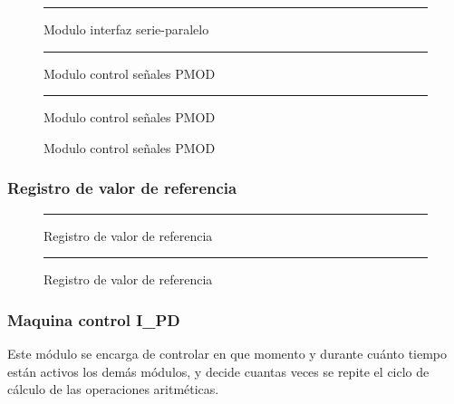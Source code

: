 \documentclass[12pt,a4paper]{article} %
\begin{document}
\begin{figure}[htbp]
  \centering
    \rule{35em}{0.3pt}
  \caption[ser_par]{Modulo interfaz serie-paralelo}
  \label{fig:ser_par}
\end{figure}

\begin{figure}[htbp]
  \centering
    \rule{35em}{0.3pt}
  \caption[PMOD]{Modulo control señales PMOD}
  \label{fig:PMOD}
\end{figure}

\begin{figure}[htbp]
  \centering
    \rule{35em}{0.3pt}
  \caption[CLK12.5]{Modulo control señales PMOD}
  \label{fig:CLK12.5}
\end{figure}

\begin{figure}[htbp]
  \centering
  \caption[CLK200]{Modulo control señales PMOD}
  \label{fig:CLK200}
\end{figure}

\subsubsection{Registro de valor de referencia}

\begin{figure}[htbp]
  \centering
    \rule{35em}{0.3pt}
  \caption[REF]{Registro de valor de referencia}
  \label{fig:REF}
\end{figure}

\begin{figure}[htbp]
  \centering
    \rule{35em}{0.3pt}
  \caption[rebot]{Registro de valor de referencia}
  \label{fig:rebot}
\end{figure}

\subsubsection{Maquina control I\_PD}

Este módulo se encarga de controlar en que momento y durante cuánto tiempo están activos los demás módulos, y decide cuantas veces se repite el ciclo de cálculo de las operaciones aritméticas. 
\end{document}

